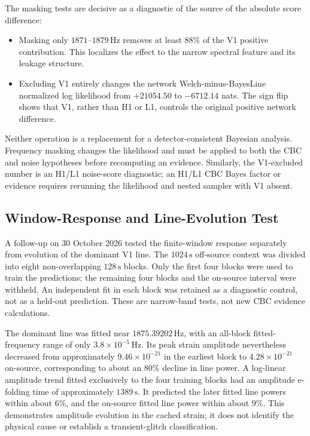 The masking tests are decisive as a diagnostic of the source of the absolute
score difference:
\begin{itemize}
\item Masking only $1871$--$1879\,\mathrm{Hz}$ removes at least $88\%$ of the
V1 positive contribution. This localizes the effect to the narrow spectral
feature and its leakage structure.
\item Excluding V1 entirely changes the network Welch-minus-BayesLine
normalized log likelihood from $+21054.50$ to $-6712.14$ nats. The sign flip
shows that V1, rather than H1 or L1, controls the original positive network
difference.
\end{itemize}

Neither operation is a replacement for a detector-consistent Bayesian
analysis. Frequency masking changes the likelihood and must be applied to
both the CBC and noise hypotheses before recomputing an evidence. Similarly,
the V1-excluded number is an H1/L1 noise-score diagnostic; an H1/L1 CBC Bayes
factor or evidence requires rerunning the likelihood and nested sampler with
V1 absent.

\subsection{Window-Response and Line-Evolution Test}

A follow-up on 30 October 2026 tested the finite-window response separately
from evolution of the dominant V1 line. The $1024\,\mathrm{s}$ off-source
context was divided into eight non-overlapping $128\,\mathrm{s}$ blocks.
Only the first four blocks were used to train the predictions; the remaining
four blocks and the on-source interval were withheld. An independent fit
in each block was retained as a diagnostic control, not as a held-out
prediction. These are narrow-band tests, not new CBC evidence calculations.

The dominant line was fitted near $1875.39202\,\mathrm{Hz}$, with an
all-block fitted-frequency range of only $3.8\times10^{-5}\,\mathrm{Hz}$.
Its peak strain amplitude nevertheless decreased from approximately
$9.46\times10^{-21}$ in the earliest block to $4.28\times10^{-21}$
on-source, corresponding to about an $80\%$ decline in line power.
A log-linear amplitude trend fitted exclusively to the four training blocks
had an amplitude e-folding time of approximately $1389\,\mathrm{s}$.
It predicted the later fitted line powers within about $6\%$, and the
on-source fitted line power within about $9\%$. This demonstrates amplitude
evolution in the cached strain; it does not identify the physical cause or
establish a transient-glitch classification.

